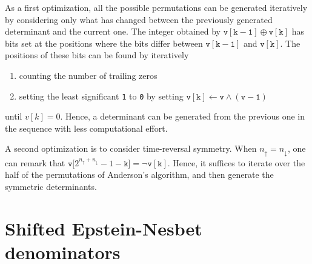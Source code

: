 \documentclass[aip,jcp,reprint,showkeys]{revtex4-1}
\newcommand{\up}{\uparrow}
\newcommand{\dn}{\downarrow}
\newcommand{\one}{{\texttt{1}}}
\newcommand{\zero}{{\texttt{0}}}
\begin{document}
As a first optimization, all the possible permutations can be generated
iteratively by considering only what has changed between the previously
generated determinant and the current one.
The integer obtained by $\mathtt{v[k-1]} \oplus \mathtt{v[k]}$ has bits set at
the positions where the bits differ between $\mathtt{v[k-1]}$ and
$\mathtt{v[k]}$. The positions of these bits can be found by iteratively
\begin{enumerate}
\item counting the number of trailing zeros
\item setting the least significant {\one} to {\zero} by setting
      $\mathtt{v[k] \gets v \wedge (v-1)}$
\end{enumerate}
until $v[k] = 0$. Hence, a determinant can be generated from the previous
one in the sequence with less computational effort.

A second optimization is to consider time-reversal symmetry. When $n_\up =
n_\dn$, one can remark that $\mathtt{v[}2^{n_\up+n_\dn}-1-\mathtt{k]} = \neg \mathtt{v[k]}$.
Hence, it suffices to iterate over the half of the permutations of Anderson's
algorithm, and then generate the symmetric determinants.


\section{Shifted Epstein-Nesbet denominators}
\end{document}
